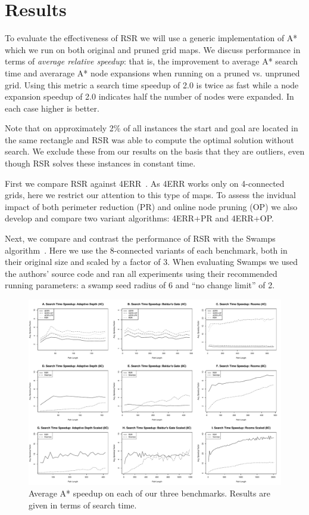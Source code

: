 \section{Results}
\label{sec-results}
To evaluate the effectiveness of RSR we will use a generic implementation of A* 
which we run on both original and pruned grid maps.
We discuss performance in terms of \emph{average relative speedup}: 
that is, the improvement to average A* search time and averarage
A* node expansions when running on a pruned  vs. unpruned grid.
Using this metric a search time speedup of 2.0 is twice as fast while
a node expansion speedup of 2.0 indicates half the number of nodes were expanded.
In each case higher is better.
\par
Note that on approximately 2\% of all instances the start and goal are located
in the same rectangle and RSR was able to compute the optimal solution without
search.  We exclude these from our results on the basis that they are outliers,
even though RSR solves these instances in constant time.
\par
First we compare RSR against 4ERR~\cite{harabor10}.  As 4ERR works only on
4-connected grids, here we restrict our attention to this type of maps.  To
assess the invidual impact of both perimeter reduction (PR) and online node
pruning (OP) we also develop and compare two variant algorithms: 4ERR+PR and
4ERR+OP.

Next, we compare and contrast the performance of RSR with the Swamps
algorithm~\cite{pochter10}.  Here we use the 8-connected variants of each
benchmark, both in their original size and scaled by a factor of 3.  When
evaluating Swamps we used the authors' source code and ran all experiments using
their recommended running parameters: a swamp seed radius of 6 and ``no change
limit'' of 2.
\par 
\begin{figure}[t]
       \begin{center}
                       \includegraphics[width=1.85\columnwidth, trim = 10mm 10mm 10mm 0mm]{diagrams/speedup.pdf}
       \end{center}
       \caption{Average A* speedup on each of our three benchmarks. 
		Results are given in terms of search time.}
\label{fig-speedup}
\end{figure}

